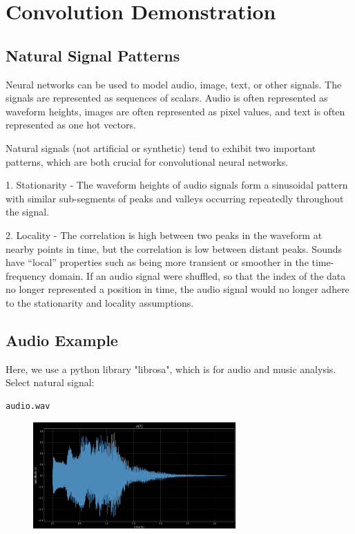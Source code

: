 \chapter{Convolution Demonstration}
\section{Natural Signal Patterns}
Neural networks can be used to model audio, image, text, or other signals. The signals are represented as sequences of scalars. Audio is often represented as waveform heights, images are often represented as pixel values, and text is often represented as one hot vectors.

Natural signals (not artificial or synthetic) tend to exhibit two important patterns, which are both crucial for convolutional neural networks.

1. Stationarity - The waveform heights of audio signals form a sinusoidal pattern with similar sub-segments of peaks and valleys occurring repeatedly throughout the signal.

2. Locality - The correlation is high between two peaks in the waveform at nearby points in time, but the correlation is low between distant peaks. Sounds have “local” properties such as being more transient or smoother in the time-frequency domain. If an audio signal were shuffled, so that the index of the data no longer represented a position in time, the audio signal would no longer adhere to the stationarity and locality assumptions.



\section{Audio Example}
Here, we use a python library "librosa", which is for audio and music analysis. Select natural signal: \begin{verbatim}audio.wav\end{verbatim}

\begin{figure}[H]
    \centering
    \includegraphics[width=220pt]{labs/04/images/1.png}
    \label{fig:waveform}
\end{figure}

